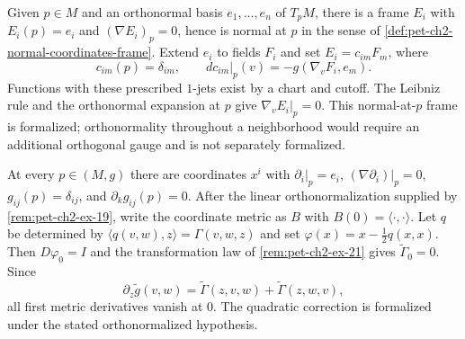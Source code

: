 \begin{remark}
  \label{rem:pet-ch2-ex-19}
  \leanok
  Given $p\in M$ and an orthonormal basis
  $e_1,\dots,e_n$ of $T_pM$, there is a frame $E_i$ with
  $E_i(p)=e_i$ and $(\nabla E_i)_p=0$, hence is normal at $p$ in the sense of
  \cref{def:pet-ch2-normal-coordinates-frame}.
  \sketch
  Extend $e_i$ to fields $F_i$ and set $E_i=c_{im}F_m$, where
  \[
    c_{im}(p)=\delta_{im},\qquad
    dc_{im}|_p(v)=-g(\nabla_vF_i,e_m).
  \]
  Functions with these prescribed $1$-jets exist by a chart and cutoff. The
  Leibniz rule and the orthonormal expansion at $p$ give
  $\nabla_vE_i|_p=0$. This normal-at-$p$ frame is formalized; orthonormality
  throughout a neighborhood would require an additional orthogonal gauge and
  is not separately formalized.
\end{remark}

\begin{remark}
  \label{rem:pet-ch2-ex-20}
  \leanok
  At every $p\in(M,g)$ there are coordinates
  $x^i$ with $\partial_i|_p=e_i$,
  $(\nabla\partial_i)|_p=0$, $g_{ij}(p)=\delta_{ij}$, and
  $\partial_kg_{ij}(p)=0$.
  \sketch
  After the linear orthonormalization supplied by
  \cref{rem:pet-ch2-ex-19}, write the coordinate metric as $B$ with
  $B(0)=\langle\cdot,\cdot\rangle$. Let $q$ be determined by
  $\langle q(v,w),z\rangle=\Gamma(v,w,z)$ and set
  $\varphi(x)=x-\tfrac12q(x,x)$. Then $D\varphi_0=I$ and the transformation
  law of \cref{rem:pet-ch2-ex-21} gives $\widetilde\Gamma_0=0$. Since
  \[
    \partial_z\widetilde g(v,w)
      =\widetilde\Gamma(z,v,w)+\widetilde\Gamma(z,w,v),
  \]
  all first metric derivatives vanish at $0$. The quadratic correction is
  formalized under the stated orthonormalized hypothesis.
\end{remark}

